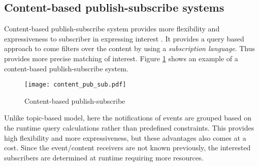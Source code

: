 \subsection{Content-based publish-subscribe systems}

Content-based publish-subscribe system provides more flexibility \parencite{Aguilera:1999:MEC:301308.301326} and expressiveness to subscriber in expressing interest \parencite{Shen2010}. It provides a query based approach to come filters over the content by using a \textit {subscription language}. Thus provides more precise matching of interest. Figure \ref{figures:content_pub_sub} shows an example of a content-based publish-subscribe system.

    \makeatletter
    \setlength{\intextsep}{20pt}
    \makeatother

    \begin{figure}[h!]
    \centering
    \texttt{[image: content\_pub\_sub.pdf]}
    \caption{Content-based publish-subscribe}\label{figures:content_pub_sub}
    \end{figure}

Unlike topic-based model, here the notifications of events are grouped based on the runtime query calculations rather than predefined constraints. This provides high flexibility and more expressiveness, but these advantages also comes at a cost. Since the event/content receivers are not known previously, the interested subscribers are determined at runtime requiring more resources.  

